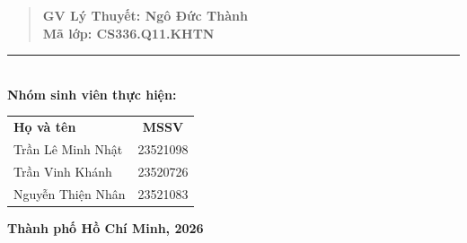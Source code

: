 \documentclass[12pt,a4paper]{article}
\begin{document}
\begin{titlepage}




\vspace{0.5pt}
\begin{quote}
\textbf{GV Lý Thuyết: Ngô Đức Thành} \\
\textbf{Mã lớp: CS336.Q11.KHTN} \\
\end{quote}
\vspace{-10pt}
\noindent
\centering
\vspace{5pt}\rule{12cm}{0.8pt} \\
\textbf{Nhóm sinh viên thực hiện:} \\

\begin{table}[ht]
    \centering
    \begin{tabular}{l c} 
            \textbf{Họ và tên}    & \textbf{MSSV} \\
        Trần Lê Minh Nhật & 23521098 \\
        Trần Vinh Khánh & 23520726 \\
        Nguyễn Thiện Nhân & 23521083\\
    \end{tabular}
    
\end{table}



\vspace{20pt}
\begin{center}
    \textbf{Thành phố Hồ Chí Minh, 2026}
\end{center}
\end{titlepage}
\end{document}
